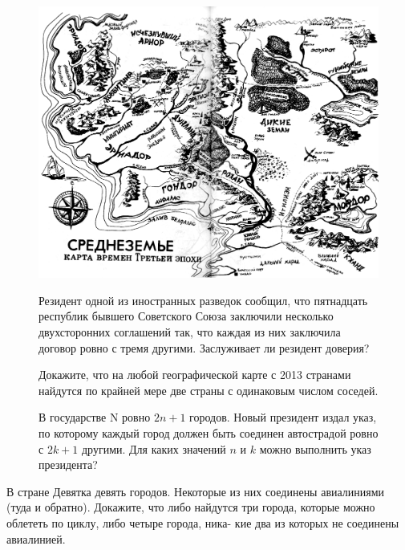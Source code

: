 \begin{figure}[H]\begin{minipage}{0.3\linewidth}
\includegraphics[width=0.95\columnwidth]{img/10.3 sredn.png}
\end{minipage}
\hfill
\begin{minipage}{0.69\linewidth}\setlength{\parindent}{1.5em}
    \begin{ex}
    Резидент одной из иностранных разведок сообщил, что пятнадцать республик бывшего Советского Союза заключили несколько двухсторонних соглашений так, что каждая из них заключила договор ровно с тремя другими. Заслуживает ли резидент доверия?
\end{ex}

\begin{ex}
    Докажите, что на любой географической карте с 2013 странами найдутся по крайней мере две страны с одинаковым числом соседей.
\end{ex}

\begin{ex} \label{10.3 ex18}
    В государстве N ровно $2n + 1$ городов. Новый президент издал указ, по которому каждый город должен быть соединен автострадой ровно с $2k + 1$ другими. Для каких значений $n$ и $k$ можно выполнить указ президента?
\end{ex}
\end{minipage}
\end{figure}

\begin{ex}
    В стране Девятка девять городов. Некоторые из них соединены авиалиниями (туда и обратно). Докажите, что либо найдутся три города, которые можно облететь по циклу, либо четыре города, ника-
кие два из которых не соединены авиалинией.
\end{ex}

